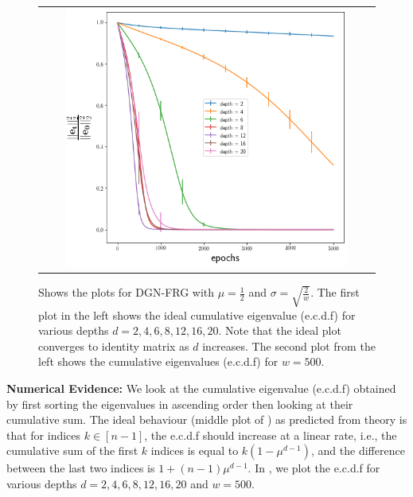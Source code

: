 \begin{figure}
{\begin{tabular}{ccccc}
&
&
\includegraphics[scale=0.4]{figs/dgn-fra-conv-w500.png}
\end{tabular}
}
\caption{Shows the plots for DGN-FRG with $\mu=\frac{1}{2}$ and $\sigma=\sqrt{\frac{2}{w}}$. The first plot in the left shows the ideal cumulative eigenvalue (e.c.d.f) for various depths $d=2,4,6,8,12,16,20$. Note that the ideal plot converges to identity matrix as $d$ increases. The second plot from the left shows the cumulative eigenvalues (e.c.d.f) for $w=500$. }
\label{fig:dgn-frg-gram-ecdf}
\end{figure}
\textbf{Numerical Evidence:} We look at the cumulative eigenvalue (e.c.d.f) obtained by first sorting the eigenvalues in ascending order then looking at their cumulative sum. The ideal behaviour (middle plot of ) as predicted from theory is that for indices $k\in[n-1]$, the e.c.d.f should increase at a linear rate, i.e., the cumulative sum of the first $k$ indices is equal to $k(1-\mu^{d-1})$, and the difference between the last two indices is $1+(n-1)\mu^{d-1}$. In , we plot the e.c.d.f for various depths $d=2,4,6,8,12,16,20$ and $w=500$. 

